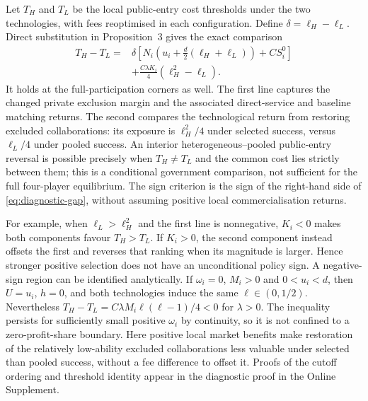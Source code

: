 \documentclass[11pt]{article}
\begin{document}
Let $T_H$ and $T_L$ be the local public-entry cost thresholds under the two technologies, with fees reoptimised in each configuration.
Define $\delta=\ell_H-\ell_L$.
Direct substitution in Proposition~3 gives the exact comparison
\begin{equation}
 \begin{split}
 T_H-T_L={}&\delta\left[N_i\left(u_i+\frac d2(\ell_H+\ell_L)\right)
                         +CS_i^0\right]\\
 &+\frac{C\lambda K_i}{4}(\ell_H^2-\ell_L).
 \end{split}\label{eq:diagnostic-gap}
\end{equation}
It holds at the full-participation corners as well.
The first line captures the changed private exclusion margin and the associated direct-service and baseline matching returns.
The second compares the technological return from restoring excluded collaborations: its exposure is $\ell_H^2/4$ under selected success, versus $\ell_L/4$ under pooled success.
An interior heterogeneous--pooled public-entry reversal is possible precisely when $T_H\ne T_L$ and the common cost lies strictly between them; this is a conditional government comparison, not sufficient for the full four-player equilibrium.
The sign criterion is the sign of the right-hand side of \eqref{eq:diagnostic-gap}, without assuming positive local commercialisation returns.

For example, when $\ell_L>\ell_H^2$ and the first line is nonnegative, $K_i<0$ makes both components favour $T_H>T_L$.
If $K_i>0$, the second component instead offsets the first and reverses that ranking when its magnitude is larger.
Hence stronger positive selection does not have an unconditional policy sign.
A negative-sign region can be identified analytically.
If $\omega_i=0$, $M_i>0$ and $0<u_i<d$, then $U=u_i$, $h=0$, and both technologies induce the same $\ell\in(0,1/2)$.
Nevertheless $T_H-T_L=C\lambda M_i\ell(\ell-1)/4<0$ for $\lambda>0$.
The inequality persists for sufficiently small positive $\omega_i$ by continuity, so it is not confined to a zero-profit-share boundary.
Here positive local market benefits make restoration of the relatively low-ability excluded collaborations less valuable under selected than pooled success, without a fee difference to offset it.
Proofs of the cutoff ordering and threshold identity appear in the diagnostic proof in the Online Supplement.
\end{document}
